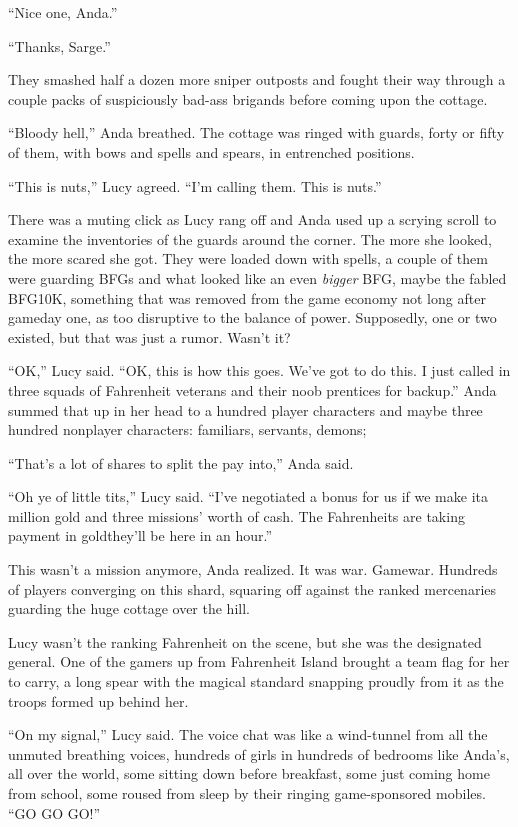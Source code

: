 “Nice one, Anda.”

“Thanks, Sarge.”

\tb

They smashed half a dozen more sniper outposts and fought their way
through a couple packs of suspiciously bad-ass brigands before
coming upon the cottage.

“Bloody hell,” Anda breathed. The cottage was ringed with guards,
forty or fifty of them, with bows and spells and spears, in
entrenched positions.

“This is nuts,” Lucy agreed. “I’m calling them. This is nuts.”

There was a muting click as Lucy rang off and Anda used up a
scrying scroll to examine the inventories of the guards around the
corner. The more she looked, the more scared she got. They were
loaded down with spells, a couple of them were guarding BFGs and
what looked like an even \emph{bigger} BFG, maybe the fabled
BFG10K, something that was removed from the game economy not long
after gameday one, as too disruptive to the balance of power.
Supposedly, one or two existed, but that was just a rumor. Wasn’t
it?

“OK,” Lucy said. “OK, this is how this goes. We’ve got to do this.
I just called in three squads of Fahrenheit veterans and their noob
prentices for backup.” Anda summed that up in her head to a hundred
player characters and maybe three hundred nonplayer characters:
familiars, servants, demons;

“That’s a lot of shares to split the pay into,” Anda said.

“Oh ye of little tits,” Lucy said. “I’ve negotiated a bonus for us
if we make it\dash{}a million gold and three missions’ worth of cash. The
Fahrenheits are taking payment in gold\dash{}they’ll be here in an
hour.”

This wasn’t a mission anymore, Anda realized. It was war. Gamewar.
Hundreds of players converging on this shard, squaring off against
the ranked mercenaries guarding the huge cottage over the hill.

\tb

Lucy wasn’t the ranking Fahrenheit on the scene, but she was the
designated general. One of the gamers up from Fahrenheit Island
brought a team flag for her to carry, a long spear with the magical
standard snapping proudly from it as the troops formed up behind
her.

“On my signal,” Lucy said. The voice chat was like a wind-tunnel
from all the unmuted breathing voices, hundreds of girls in
hundreds of bedrooms like Anda’s, all over the world, some sitting
down before breakfast, some just coming home from school, some
roused from sleep by their ringing game-sponsored mobiles. “GO GO
GO!”

